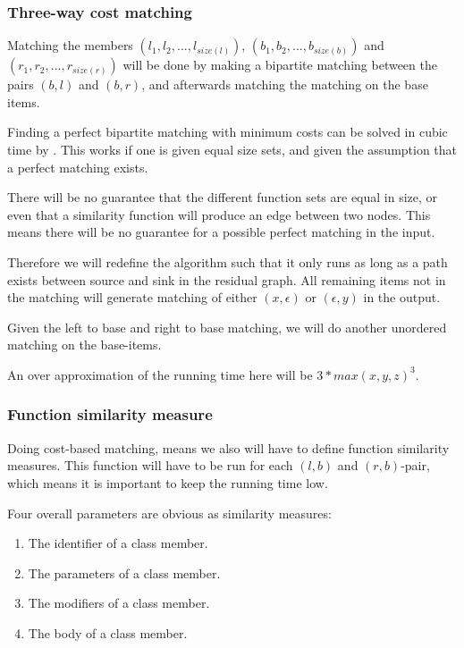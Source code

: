 \documentclass[11pt]{article}
\begin{document}
\subsubsection{Three-way cost matching}
Matching the members $(l_1, l_2, ..., l_{size(l)})$, $(b_1, b_2, ..., b_{size(b)})$ and $(r_1, r_2, ..., r_{size(r)})$ will be done by making a bipartite matching between the pairs $(b, l)$ and $(b, r)$, and afterwards matching the matching on the base items.

Finding a perfect bipartite matching with minimum costs can be solved in cubic time by \citet{bipartitecost}. This works if one is given equal size sets, and given the assumption that a perfect matching exists.

There will be no guarantee that the different function sets are equal in size, or even that a similarity function will produce an edge between two nodes. This means there will be no guarantee for a possible perfect matching in the input. 

Therefore we will redefine the algorithm such that it only runs as long as a path exists between source and sink in the residual graph. All remaining items not in the matching will generate matching of either $(x, \epsilon)$ or $(\epsilon, y)$ in the output.

Given the left to base and right to base matching, we will do another unordered matching on the base-items.


An over approximation of the running time here will be  $3*max(x, y, z)^3$.

\subsubsection{Function similarity measure}
Doing cost-based matching, means we also will have to define function similarity measures. This function will have to be run for each $(l, b)$ and $(r, b)$-pair, which means it is important to keep the running time low.

Four overall parameters are obvious as similarity measures:

\begin{enumerate}
    \item The identifier of a class member.
    \item The parameters of a class member.
    \item The modifiers of a class member.
    \item The body of a class member.
\end{enumerate}
\end{document}
